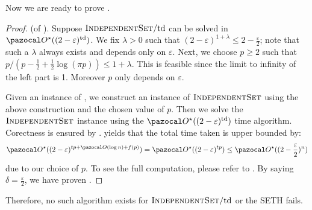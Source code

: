 

Now we are ready to prove .

\begin{proof}
    (of ). Suppose $\textsc{IndependentSet}/\text{td}$ can be solved in $\O^\star((2-\varepsilon)^\td)$. We fix $\lambda > 0$ such that $(2 - \varepsilon)^{1 + \lambda} \leq 2 - \frac{\varepsilon}{2}$; note that such a $\lambda$ always exists and depends only on $\varepsilon$. Next, we choose $p \geq 2$ such that $p/(p - \frac{1}{2} + \frac{1}{2}\log(\pi p)) \leq 1 + \lambda$. This is feasible since the limit to infinity of the left part is 1. Moreover $p$ only depends on $\varepsilon$. 
    
    Given an instance of , we construct an instance of $\textsc{IndependentSet}$ using the above construction and the chosen value of $p$. Then we solve the $\textsc{IndependentSet}$ instance using the $\O^\star((2 - \varepsilon)^\td)$ time algorithm. Corectness is ensured by .  yields that the total time taken is upper bounded by: $$\O^\star((2-\varepsilon)^{tp + \O(\log n) + f(p)}) = \O^\star((2-\varepsilon)^{tp}) \leq \O^\star((2-\frac{\varepsilon}{2})^{n})$$ due to our choice of $p$. To see the full computation, please refer to . By saying $\delta = \frac{\varepsilon}{2}$, we have proven .
\end{proof}

Therefore, no such algorithm exists for $\textsc{IndependentSet}/\text{td}$ or the SETH fails.